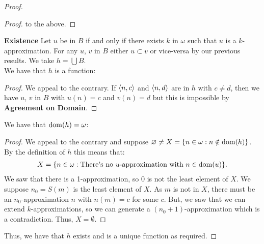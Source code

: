 \begin{proof}
\begin{proof}
        to the above.
    \end{proof}
    \vspace{3mm}\noindent
    \textbf{Existence} \newline
    Let $u$ be in $B$ if and only if there exists $k$ in $\omega$ such that
    $u$ is a $k$-approximation. For any $u$, $v$ in $B$ either $u \subset v$
    or vice-versa by our previous results. We take $h = \bigcup B$.
    \\[\baselineskip]
    We have that $h$ is a function: \begin{proof}
        We appeal to the contrary.
        If $\langle n, c \rangle$ and $\langle n, d \rangle$ are in $h$ with $c \neq d$,
        then we have $u$, $v$ in $B$ with $u(n) = c$ and $v(n) = d$
        but this is impossible by \textbf{Agreement on Domain}.
    \end{proof}
    \noindent
    We have that $\operatorname{dom}(h) = \omega$: \begin{proof}
        We appeal to the contrary and
        suppose $\varnothing \neq X = \{n \in \omega : n \notin \operatorname{dom}(h)\}$.
        By the definition of $h$ this means that: \begin{align*}
            X = \{n \in \omega : \text{There's no } u\text{-approximation with }
                n \in \operatorname{dom}(u)\}.
        \end{align*} We saw that there is a 1-approximation, so 0 is not
        the least element of $X$. We suppose $n_0 = S(m)$ is the least
        element of $X$. As $m$ is not in $X$, there must be an $n_0$-approximation
        $n$ with $n(m) = c$ for some $c$. But, we saw that we can extend
        $k$-approximations, so we can generate a $(n_0 + 1)$-approximation
        which is a contradiction.
        Thus, $X = \emptyset$.
    \end{proof} 
    \noindent
    Thus, we have that $h$ exists and is a unique function as required.
\end{proof} 